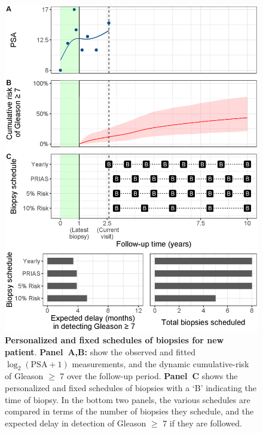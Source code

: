 \begin{figure}[!htb]
\centerline{\includegraphics[width=\columnwidth]{images/demo_pat1.eps}}
\caption{\textbf{Personalized and fixed schedules of biopsies for new patient}. \textbf{Panel~A,B:} show the observed and fitted $\log_2(\mbox{PSA} + 1)$ measurements, and the dynamic cumulative-risk of Gleason $\geq$ 7 over the follow-up period. \textbf{Panel~C} shows the personalized and fixed schedules of biopsies with a `B' indicating the time of biopsy. In the bottom two panels, the various schedules are compared in terms of the number of biopsies they schedule, and the expected delay in detection of Gleason $\geq$ 7 if they are followed.}
\label{fig:demo_pat1}
\end{figure}